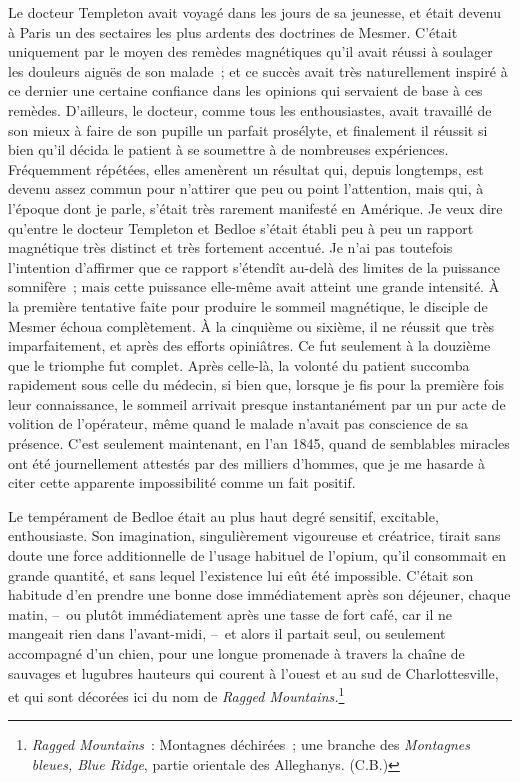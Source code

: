 \documentclass[french,twoside]{book} %
\begin{document}
Le docteur Templeton avait voyagé dans les jours de sa jeunesse, et était devenu à Paris un des sectaires les plus ardents des doctrines de Mesmer. C’était uniquement par le moyen des remèdes magnétiques qu’il avait réussi à soulager les douleurs aiguës de son malade ; et ce succès avait très naturellement inspiré à ce dernier une certaine confiance dans les opinions qui servaient de base à ces remèdes. D’ailleurs, le docteur, comme tous les enthousiastes, avait travaillé de son mieux à faire de son pupille un parfait prosélyte, et finalement il réussit si bien qu’il décida le patient à se soumettre à de nombreuses expériences. Fréquemment répétées, elles amenèrent un résultat qui, depuis longtemps, est devenu assez commun pour n’attirer que peu ou point l’attention, mais qui, à l’époque dont je parle, s’était très rarement manifesté en Amérique. Je veux dire qu’entre le docteur Templeton et Bedloe s’était établi peu à peu un rapport magnétique très distinct et très fortement accentué. Je n’ai pas toutefois l’intention d’affirmer que ce rapport s’étendît au-delà des limites de la puissance somnifère ; mais cette puissance elle-même avait atteint une grande intensité. À la première tentative faite pour produire le sommeil magnétique, le disciple de Mesmer échoua complètement. À la cinquième ou sixième, il ne réussit que très imparfaitement, et après des efforts opiniâtres. Ce fut seulement à la douzième que le triomphe fut complet. Après celle-là, la volonté du patient succomba rapidement sous celle du médecin, si bien que, lorsque je fis pour la première fois leur connaissance, le sommeil arrivait presque instantanément par un pur acte de volition de l’opérateur, même quand le malade n’avait pas conscience de sa présence. C’est seulement maintenant, en l’an 1845, quand de semblables miracles ont été journellement attestés par des milliers d’hommes, que je me hasarde à citer cette apparente impossibilité comme un fait positif.\par
Le tempérament de Bedloe était au plus haut degré sensitif, excitable, enthousiaste. Son imagination, singulièrement vigoureuse et créatrice, tirait sans doute une force additionnelle de l’usage habituel de l’opium, qu’il consommait en grande quantité, et sans lequel l’existence lui eût été impossible. C’était son habitude d’en prendre une bonne dose immédiatement après son déjeuner, chaque matin, – ou plutôt immédiatement après une tasse de fort café, car il ne mangeait rien dans l’avant-midi, – et alors il partait seul, ou seulement accompagné d’un chien, pour une longue promenade à travers la chaîne de sauvages et lugubres hauteurs qui courent à l’ouest et au sud de Charlottesville, et qui sont décorées ici du nom de \emph{Ragged Mountains.}\footnote{\emph{Ragged Mountains} : Montagnes déchirées ; une branche des \emph{Montagnes bleues, Blue Ridge}, partie orientale des Alleghanys. (C.B.)}\par
\end{document}

